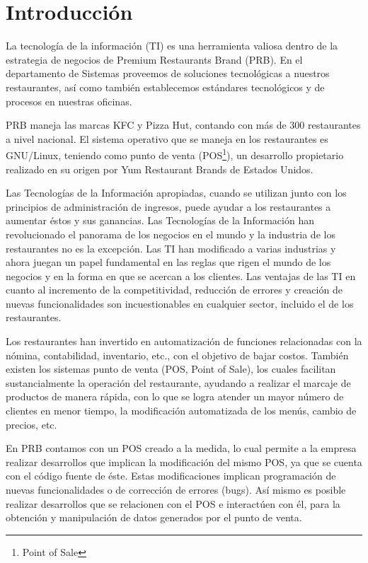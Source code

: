 
\chapter*{Introducción}
\label{chap:intro}

La tecnología de la información (TI) es una herramienta valiosa dentro de la estrategia de negocios de Premium Restaurants Brand (PRB). En el departamento de Sistemas proveemos de soluciones tecnológicas a nuestros restaurantes, así como también establecemos estándares tecnológicos y de procesos en nuestras oficinas.

PRB maneja las marcas KFC y Pizza Hut, contando con más de 300 restaurantes a nivel nacional. El sistema operativo que se maneja en los restaurantes es GNU/Linux, teniendo como punto de venta (POS\footnote{Point of Sale}), un desarrollo propietario realizado en su origen por Yum Restaurant Brands de Estados Unidos.

Las Tecnologías de la Información apropiadas, cuando se utilizan junto con los principios de administración de ingresos, puede ayudar a los restaurantes a aumentar éstos y sus ganancias. Las Tecnologías de la Información han revolucionado el panorama de los negocios en el mundo y la industria de los restaurantes no es la excepción. Las TI han modificado a varias industrias y ahora juegan un papel fundamental en las reglas que rigen el mundo de los negocios y en la forma en que se acercan a los clientes. Las ventajas de las TI en cuanto al incremento de la competitividad, reducción de errores y creación de nuevas funcionalidades son incuestionables en cualquier sector, incluido el de los restaurantes.

Los restaurantes han invertido en automatización de funciones relacionadas con la nómina, contabilidad, inventario, etc., con el objetivo de bajar costos. También existen los sistemas punto de venta (POS, Point of Sale), los cuales facilitan sustancialmente la operación del restaurante, ayudando a realizar el marcaje de productos de manera rápida, con lo que se logra atender un mayor número de clientes en menor tiempo, la modificación automatizada de los menús, cambio de precios, etc.

En PRB contamos con un POS creado a la medida, lo cual permite a la empresa realizar desarrollos que implican la modificación del mismo POS, ya que se cuenta con el código fuente de éste. Estas modificaciones implican programación de nuevas funcionalidades o de corrección de errores (bugs). Así mismo es posible realizar desarrollos que se relacionen con el POS e interactúen con él, para la obtención y manipulación de datos generados por el punto de venta.

